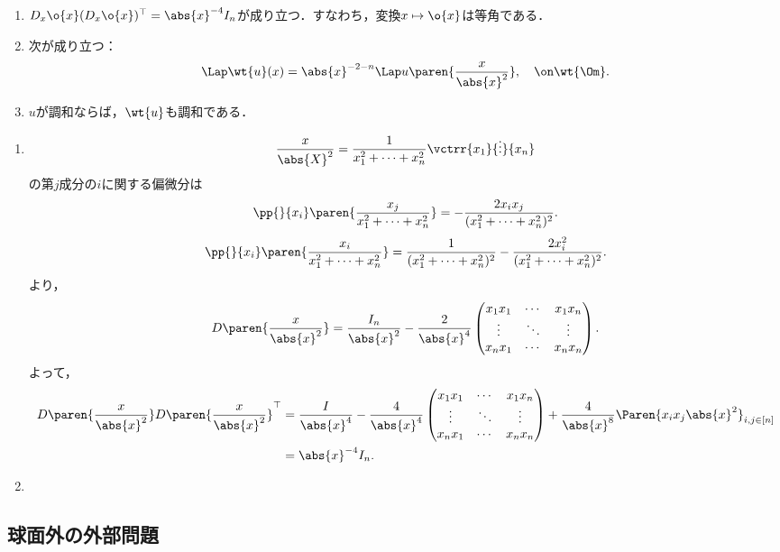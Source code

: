 \documentclass[uplatex,dvipdfmx]{jsreport}
\begin{document}
\begin{proposition}\mbox{}
    \begin{enumerate}
        \item $D_x\o{x}(D_x\o{x})^\top=\abs{x}^{-4}I_n$が成り立つ．すなわち，変換$x\mapsto\o{x}$は等角である．
        \item 次が成り立つ：
        \[\Lap\wt{u}(x)=\abs{x}^{-2-n}\Lap u\paren{\frac{x}{\abs{x}^2}},\quad\on\wt{\Om}.\]
        \item $u$が調和ならば，$\wt{u}$も調和である．
    \end{enumerate}
\end{proposition}
\begin{Proof}\mbox{}
    \begin{enumerate}
        \item \[\frac{x}{\abs{X}^2}=\frac{1}{x^2_1+\cdots+x_n^2}\vctrr{x_1}{\vdots}{x_n}\]
        の第$j$成分の$i$に関する偏微分は
        \[\pp{}{x_i}\paren{\frac{x_j}{x_1^2+\cdots+x_n^2}}=-\frac{2x_ix_j}{(x_1^2+\cdots+x_n^2)^2}.\]
        \[\pp{}{x_i}\paren{\frac{x_i}{x_1^2+\cdots+x_n^2}}=\frac{1}{(x_1^2+\cdots+x_n^2)^2}-\frac{2x_i^2}{(x_1^2+\cdots+x_n^2)^2}.\]
        より，
        \[D\paren{\frac{x}{\abs{x}^2}}=\frac{I_n}{\abs{x}^2}-\frac{2}{\abs{x}^4}\begin{pmatrix}x_1x_1&\cdots&x_1x_n\\\vdots&\ddots&\vdots\\x_nx_1&\cdots&x_nx_n\end{pmatrix}.\]
        よって，
        \begin{align*}
            D\paren{\frac{x}{\abs{x}^2}}D\paren{\frac{x}{\abs{x}^2}}^\top&=\frac{I}{\abs{x}^4}-\frac{4}{\abs{x}^4}\begin{pmatrix}x_1x_1&\cdots&x_1x_n\\\vdots&\ddots&\vdots\\x_nx_1&\cdots&x_nx_n\end{pmatrix}+\frac{4}{\abs{x}^8}\Paren{x_ix_j\abs{x}^2}_{i,j\in[n]}\\
            &=\abs{x}^{-4}I_n.
        \end{align*}
        \item 
    \end{enumerate}
\end{Proof}

\subsection{球面外の外部問題}
\end{document}
